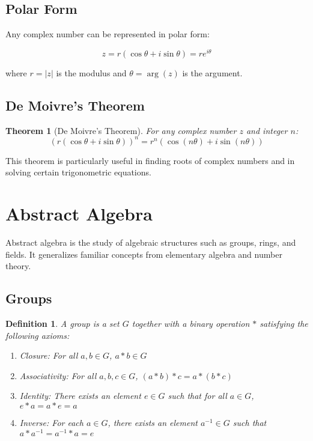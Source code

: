 \documentclass[12pt,a4paper]{article}
\newtheorem{definition}{Definition}
\newtheorem{theorem}{Theorem}
\begin{document}
\subsection{Polar Form}

Any complex number can be represented in polar form:

\[ z = r(\cos \theta + i \sin \theta) = re^{i\theta} \]

where $r = |z|$ is the modulus and $\theta = \arg(z)$ is the argument.

\subsection{De Moivre's Theorem}

\begin{theorem}[De Moivre's Theorem]
For any complex number $z$ and integer $n$:
\[ (r(\cos \theta + i \sin \theta))^n = r^n(\cos(n\theta) + i \sin(n\theta)) \]
\end{theorem}

This theorem is particularly useful in finding roots of complex numbers and in solving certain trigonometric equations.

\section{Abstract Algebra}

Abstract algebra is the study of algebraic structures such as groups, rings, and fields. It generalizes familiar concepts from elementary algebra and number theory.

\subsection{Groups}

\begin{definition}
A group is a set $G$ together with a binary operation $\ast$ satisfying the following axioms:
\begin{enumerate}
    \item Closure: For all $a, b \in G$, $a \ast b \in G$
    \item Associativity: For all $a, b, c \in G$, $(a \ast b) \ast c = a \ast (b \ast c)$
    \item Identity: There exists an element $e \in G$ such that for all $a \in G$, $e \ast a = a \ast e = a$
    \item Inverse: For each $a \in G$, there exists an element $a^{-1} \in G$ such that $a \ast a^{-1} = a^{-1} \ast a = e$
\end{enumerate}
\end{definition}
\end{document}
